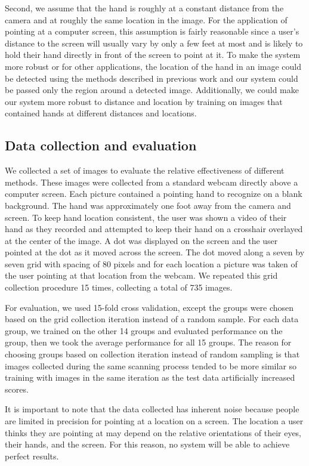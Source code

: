 \documentclass[10pt,twocolumn,letterpaper]{article}
\begin{document}
Second, we assume that the hand is roughly at a constant distance from the camera and at roughly the same location in the image.  For the application of pointing at a computer screen, this assumption is fairly reasonable since a user's distance to the screen will usually vary by only a few feet at most and is likely to hold their hand directly in front of the screen to point at it.  To make the system more robust or for other applications, the location of the hand in an image could be detected using the methods described in previous work and our system could be passed only the region around a detected image.  Additionally, we could make our system more robust to distance and location by training on images that contained hands at different distances and locations.

\subsection{Data collection and evaluation}

We collected a set of images to evaluate the relative effectiveness of different methods.  These images were collected from a standard webcam directly above a computer screen.  Each picture contained a pointing hand to recognize on a blank background.  The hand was approximately one foot away from the camera and screen.  To keep hand location consistent, the user was shown a video of their hand as they recorded and attempted to keep their hand on a crosshair overlayed at the center of the image.  A dot was displayed on the screen and the user pointed at the dot as it moved across the screen.  The dot moved along a seven by seven grid with spacing of 80 pixels and for each location a picture was taken of the user pointing at that location from the webcam.  We repeated this grid collection procedure 15 times, collecting a total of 735 images.

For evaluation, we used 15-fold cross validation, except the groups were chosen based on the grid collection iteration instead of a random sample.  For each data group, we trained on the other 14 groups and evaluated performance on the group, then we took the average performance for all 15 groups.  The reason for choosing groups based on collection iteration instead of random sampling is that images collected during the same scanning process tended to be more similar so training with images in the same iteration as the test data artificially increased scores.

It is important to note that the data collected has inherent noise because people are limited in precision for pointing at a location on a screen.  The location a user thinks they are pointing at may depend on the relative orientations of their eyes, their hands, and the screen.  For this reason, no system will be able to achieve perfect results.
\end{document}
